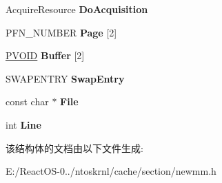 \begin{DoxyCompactItemize}
\mbox{\label{struct___m_m___r_e_q_u_i_r_e_d___r_e_s_o_u_r_c_e_s_adaba128314ad2d070be4d386a3317754}} 
Acquire\+Resource {\bfseries Do\+Acquisition}
\item 
\mbox{\label{struct___m_m___r_e_q_u_i_r_e_d___r_e_s_o_u_r_c_e_s_aca2bca58905aa13d82292620e8a49a7d}} 
P\+F\+N\+\_\+\+N\+U\+M\+B\+ER {\bfseries Page} \mbox{[}2\mbox{]}
\item 
\mbox{\label{struct___m_m___r_e_q_u_i_r_e_d___r_e_s_o_u_r_c_e_s_a0ede712fee9feb56b046ee30c16e60ac}} 
\hyperlink{interfacevoid}{P\+V\+O\+ID} {\bfseries Buffer} \mbox{[}2\mbox{]}
\item 
\mbox{\label{struct___m_m___r_e_q_u_i_r_e_d___r_e_s_o_u_r_c_e_s_a1d44725d29310913a76c59771c737550}} 
S\+W\+A\+P\+E\+N\+T\+RY {\bfseries Swap\+Entry}
\item 
\mbox{\label{struct___m_m___r_e_q_u_i_r_e_d___r_e_s_o_u_r_c_e_s_a4e54792fd36a9903272137acc588432a}} 
const char $\ast$ {\bfseries File}
\item 
\mbox{\label{struct___m_m___r_e_q_u_i_r_e_d___r_e_s_o_u_r_c_e_s_aa4b96116c4c1c0d766861476ecfaf26f}} 
int {\bfseries Line}
\end{DoxyCompactItemize}


该结构体的文档由以下文件生成\+:\begin{DoxyCompactItemize}
\item 
E\+:/\+React\+O\+S-\/0../ntoskrnl/cache/section/newmm.\+h\end{DoxyCompactItemize}
